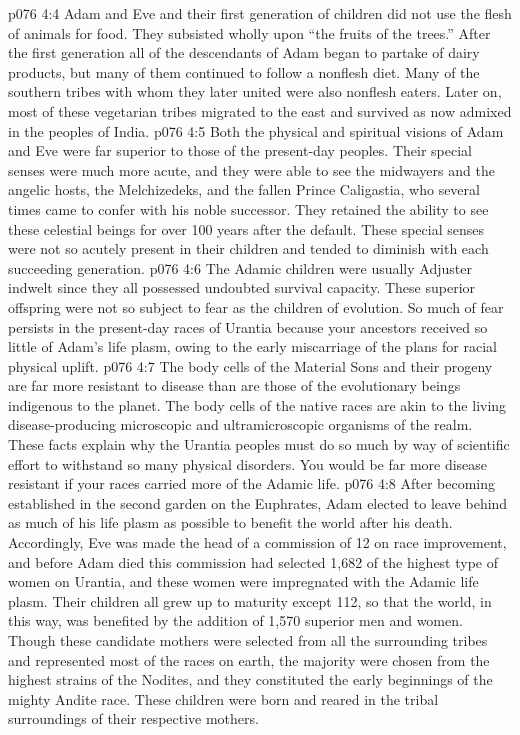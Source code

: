 \vs p076 4:4 Adam and Eve and their first generation of children did not use the flesh of animals for food. They subsisted wholly upon “the fruits of the trees.” After the first generation all of the descendants of Adam began to partake of dairy products, but many of them continued to follow a nonflesh diet. Many of the southern tribes with whom they later united were also nonflesh eaters. Later on, most of these vegetarian tribes migrated to the east and survived as now admixed in the peoples of India.
\vs p076 4:5 Both the physical and spiritual visions of Adam and Eve were far superior to those of the present\hyp{}day peoples. Their special senses were much more acute, and they were able to see the midwayers and the angelic hosts, the Melchizedeks, and the fallen Prince Caligastia, who several times came to confer with his noble successor. They retained the ability to see these celestial beings for over 100 years after the default. These special senses were not so acutely present in their children and tended to diminish with each succeeding generation.
\vs p076 4:6 The Adamic children were usually Adjuster indwelt since they all possessed undoubted survival capacity. These superior offspring were not so subject to fear as the children of evolution. So much of fear persists in the present\hyp{}day races of Urantia because your ancestors received so little of Adam’s life plasm, owing to the early miscarriage of the plans for racial physical uplift.
\vs p076 4:7 The body cells of the Material Sons and their progeny are far more resistant to disease than are those of the evolutionary beings indigenous to the planet. The body cells of the native races are akin to the living disease\hyp{}producing microscopic and ultramicroscopic organisms of the realm. These facts explain why the Urantia peoples must do so much by way of scientific effort to withstand so many physical disorders. You would be far more disease resistant if your races carried more of the Adamic life.
\vs p076 4:8 \pc After becoming established in the second garden on the Euphrates, Adam elected to leave behind as much of his life plasm as possible to benefit the world after his death. Accordingly, Eve was made the head of a commission of 12 on race improvement, and before Adam died this commission had selected 1,682 of the highest type of women on Urantia, and these women were impregnated with the Adamic life plasm. Their children all grew up to maturity except 112, so that the world, in this way, was benefited by the addition of 1,570 superior men and women. Though these candidate mothers were selected from all the surrounding tribes and represented most of the races on earth, the majority were chosen from the highest strains of the Nodites, and they constituted the early beginnings of the mighty Andite race. These children were born and reared in the tribal surroundings of their respective mothers.
